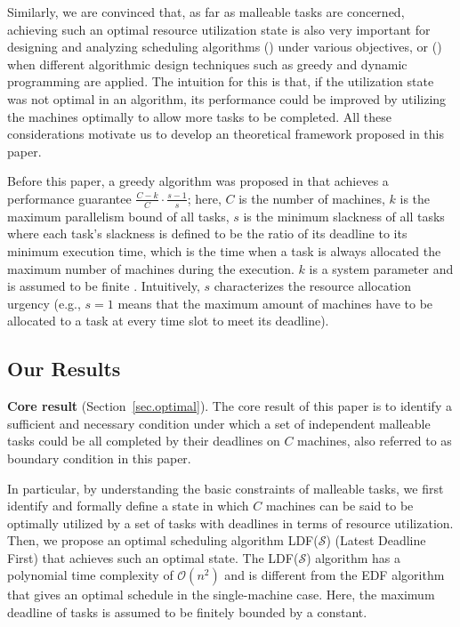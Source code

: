 \documentclass[10pt,journal,compsoc]{IEEEtran}
\newcommand{\rmnum}[1]{\romannumeral #1}
\begin{document}
Similarly, we are convinced that, as far as malleable tasks are concerned, achieving such an optimal resource utilization state is also very important for designing and analyzing scheduling algorithms (\rmnum{1}) under various objectives, or (\rmnum{2}) when different algorithmic design techniques such as greedy and dynamic programming are applied. The intuition for this is that, if the utilization state was not optimal in an algorithm, its performance could be improved by utilizing the machines optimally to allow more tasks to be completed. All these considerations motivate us to develop an theoretical framework proposed in this paper.








Before this paper, a greedy algorithm was proposed in \cite{Jain} that achieves a performance guarantee $\frac{C-k}{C}\cdot\frac{s-1}{s}$; here, $C$ is the number of machines, $k$ is the maximum parallelism bound of all tasks, $s$ is the minimum slackness of all tasks where each task's slackness is defined to be the ratio of its deadline to its minimum execution time, which is the time when a task is always allocated the maximum number of machines during the execution. $k$ is a system parameter and is assumed to be finite \cite{White}. Intuitively, $s$ characterizes the resource allocation urgency (e.g., $s=1$ means that the maximum amount of machines have to be allocated to a task at every time slot to meet its deadline).




\subsection{Our Results}
\label{sec.contributions}




\vspace{0.22em}\noindent\textbf{Core result} (Section~\ref{sec.optimal}). The core result of this paper is to identify a sufficient and necessary condition under which a set of independent malleable tasks could be all completed by their deadlines on $C$ machines, also referred to as boundary condition in this paper.







In particular, by understanding the basic constraints of malleable tasks, we first identify and formally define a state in which $C$ machines can be said to be optimally utilized by a set of tasks with deadlines in terms of resource utilization. Then, we propose an optimal scheduling algorithm LDF($\mathcal{S}$) (Latest Deadline First) that achieves such an optimal state. The LDF($\mathcal{S}$) algorithm has a polynomial time complexity of $\mathcal{O}(n^{2})$ and is different from the EDF algorithm that gives an optimal schedule in the single-machine case. Here, the maximum deadline of tasks is assumed to be finitely bounded by a constant.
\end{document}
